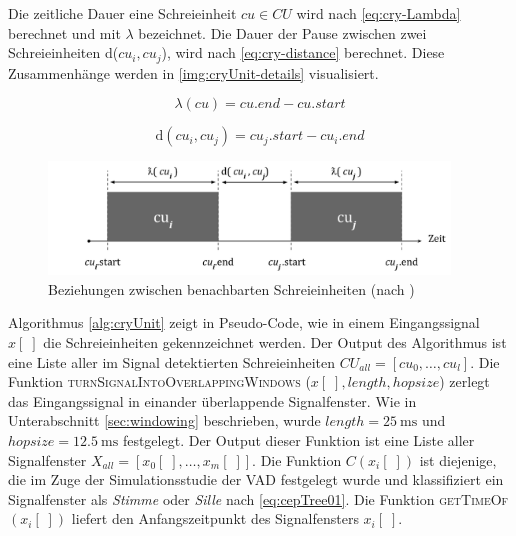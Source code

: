 Die zeitliche Dauer eine Schreieinheit $cu \in CU$ wird nach \autoref{eq:cry-Lambda} berechnet und mit $\lambda$ bezeichnet. Die Dauer der Pause zwischen zwei Schreieinheiten d($cu_i, cu_j$), wird nach \autoref{eq:cry-distance} berechnet. Diese Zusammenhänge werden in \autoref{img:cryUnit-details} visualisiert.\cite[S. 2]{vad_entropy}

\begin{equation}
\lambda (cu) = cu.end - cu.start
\label{eq:cry-Lambda}
\end{equation}

\begin{equation}
\text{d}(cu_i, cu_j) = cu_j.start - cu_i.end
\label{eq:cry-distance}
\end{equation}

\begin{figure}[h]
	\centering
	\includegraphics[width=0.95\textwidth]{bilder/newSmoothing05.png}
	\caption[Beziehungen zwischen benachbarten Schreieinheiten]{Beziehungen zwischen benachbarten Schreieinheiten (nach \cite[S. 2]{vad_entropy})}
	\label{img:cryUnit-details}
\end{figure}

Algorithmus \autoref{alg:cryUnit} zeigt in Pseudo-Code, wie in einem Eingangssignal $x[\;]$ die Schreieinheiten gekennzeichnet werden. Der Output des Algorithmus ist eine Liste aller im Signal detektierten Schreieinheiten $CU_{all} = [cu_0 , \ldots, cu_l]$. Die Funktion \textsc{turnSignalIntoOverlappingWindows} ($x[\;], length, hopsize$) zerlegt das Eingangssignal in einander überlappende Signalfenster. Wie in Unterabschnitt \ref{sec:windowing} beschrieben, wurde  $length = \SI{25}{\milli\second}$ und $hopsize = \SI{12.5}{\milli\second}$ festgelegt. Der Output dieser Funktion ist eine Liste aller Signalfenster $X_{all} = [x_0[\;] ,\ldots, x_m[\;]]$. Die Funktion $C(x_i[\;])$ ist diejenige, die im Zuge der Simulationsstudie der VAD festgelegt wurde und klassifiziert ein Signalfenster als \emph{Stimme} oder \emph{Sille} nach \autoref{eq:cepTree01}. Die Funktion \textsc{getTimeOf}$(x_i[\;])$ liefert den Anfangszeitpunkt des Signalfensters $x_i[\;]$. 

